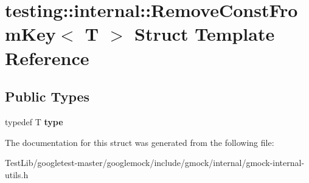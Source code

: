 \hypertarget{structtesting_1_1internal_1_1RemoveConstFromKey}{}\section{testing\+:\+:internal\+:\+:Remove\+Const\+From\+Key$<$ T $>$ Struct Template Reference}
\label{structtesting_1_1internal_1_1RemoveConstFromKey}
\subsection*{Public Types}
\begin{DoxyCompactItemize}
\item 
\mbox{\label{structtesting_1_1internal_1_1RemoveConstFromKey_ab657b0a0fe4ebc499d27011f73c794c1}} 
typedef T {\bfseries type}
\end{DoxyCompactItemize}


The documentation for this struct was generated from the following file\+:\begin{DoxyCompactItemize}
\item 
Test\+Lib/googletest-\/master/googlemock/include/gmock/internal/gmock-\/internal-\/utils.\+h\end{DoxyCompactItemize}
